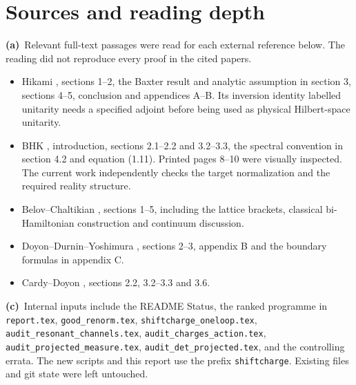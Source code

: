 \documentclass[11pt,a4paper]{article}
\newcommand{\A}{\textbf{(a)}\ }
\newcommand{\C}{\textbf{(c)}\ }
\newcommand{\file}[1]{\nolinkurl{#1}}
\begin{document}
\section{Sources and reading depth}\label{sources}
\A Relevant full-text passages were read for each external reference below.
The reading did not reproduce every proof in the cited papers.

\begin{itemize}
\item Hikami \cite{Hikami}, sections 1--2, the Baxter result and analytic
assumption in section 3, sections 4--5, conclusion and appendices A--B.
Its inversion identity labelled unitarity needs a specified adjoint before
being used as physical Hilbert-space unitarity.
\item BHK \cite{BHK}, introduction, sections 2.1--2.2 and 3.2--3.3,
the spectral convention in section 4.2 and equation (1.11).
Printed pages 8--10 were visually inspected. The current work independently
checks the target normalization and the required reality structure.
\item Belov--Chaltikian \cite{BC}, sections 1--5, including the lattice
brackets, classical bi-Hamiltonian construction and continuum discussion.
\item Doyon--Durnin--Yoshimura \cite{DDY}, sections 2--3, appendix B and
the boundary formulas in appendix C.
\item Cardy--Doyon \cite{CD}, sections 2.2, 3.2--3.3 and 3.6.
\end{itemize}

{\raggedright
\C Internal inputs include the README Status, the ranked programme in
\file{report.tex}, \file{good_renorm.tex},
\file{shiftcharge_oneloop.tex}, \file{audit_resonant_channels.tex},
\file{audit_charges_action.tex}, \file{audit_projected_measure.tex},
\file{audit_det_projected.tex}, and the controlling errata.
The new scripts and this report use the prefix \file{shiftcharge}.
Existing files and git state were left untouched.\par}
\end{document}
